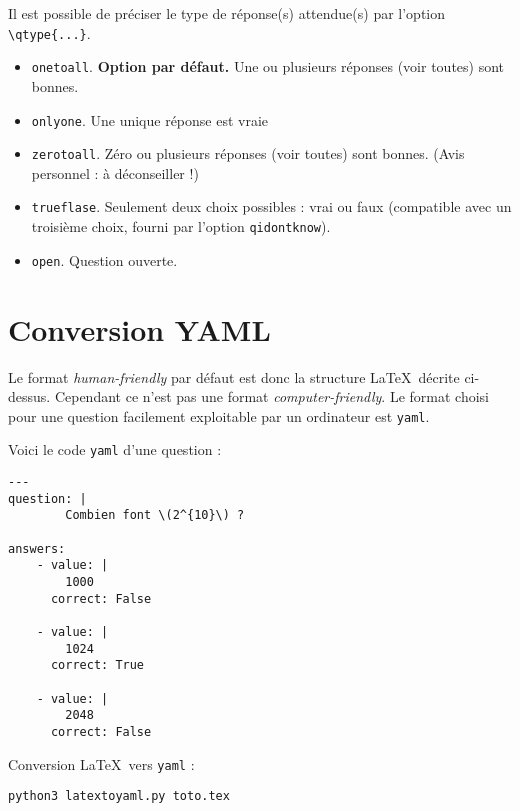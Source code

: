 \documentclass[12pt,a4paper]{article}
\begin{document}
Il est possible de préciser le type de réponse(s) attendue(s) par l'option \verb|\qtype{...}|.

\begin{itemize}
  \item  \verb|onetoall|. \textbf{Option par défaut.} Une ou plusieurs réponses (voir toutes) sont bonnes.
  \item \verb|onlyone|. Une unique réponse est vraie
  \item \verb|zerotoall|. Zéro ou plusieurs réponses (voir toutes) sont bonnes. (Avis personnel : à déconseiller !)
  \item \verb|trueflase|. Seulement deux choix possibles : vrai ou faux (compatible avec un troisième choix, fourni par l'option \verb|qidontknow|).
  \item \verb|open|. Question ouverte.
\end{itemize}  
  







\section{Conversion YAML}


Le format \emph{human-friendly} par défaut est donc la structure \LaTeX\ décrite ci-dessus. Cependant ce n'est pas une format \emph{computer-friendly}. Le format choisi pour une question facilement exploitable par un ordinateur est \texttt{yaml}.

Voici le code \texttt{yaml} d'une question :
\begin{center}
\begin{minipage}{0.8\textwidth}
\begin{verbatim}
---
question: |
        Combien font \(2^{10}\) ?

answers: 
    - value: |
        1000
      correct: False

    - value: |
        1024
      correct: True

    - value: |
        2048
      correct: False
\end{verbatim}
\end{minipage}
\end{center}

\bigskip

Conversion \LaTeX\ vers \texttt{yaml} : \\
  \centerline{\texttt{python3 latextoyaml.py toto.tex}}
\end{document}
